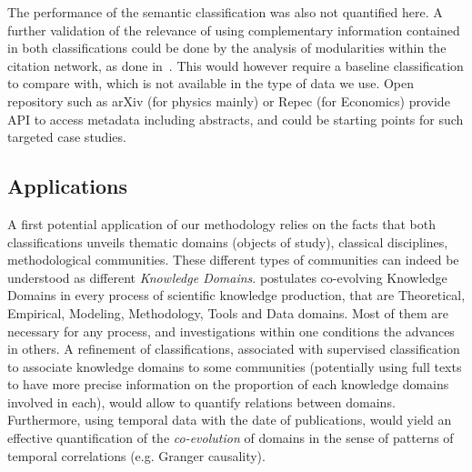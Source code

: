 
The performance of the semantic classification was also not quantified here. A further validation of the relevance of using complementary information contained in both classifications could be done by the analysis of modularities within the citation network, as done in~\cite{bergeaud2017classifying}. This would however require a baseline classification to compare with, which is not available in the type of data we use. Open repository such as arXiv (for physics mainly) or Repec (for Economics) provide API to access metadata including abstracts, and could be starting points for such targeted case studies.




\subsection*{Applications}


A first potential application of our methodology relies on the facts that both classifications unveils thematic domains (objects of study), classical disciplines, methodological communities. These different types of communities can indeed be understood as different \emph{Knowledge Domains}. \cite{raimbault2017applied} postulates co-evolving Knowledge Domains in every process of scientific knowledge production, that are Theoretical, Empirical, Modeling, Methodology, Tools and Data domains. Most of them are necessary for any process, and investigations within one conditions the advances in others. A refinement of classifications, associated with supervised classification to associate knowledge domains to some communities (potentially using full texts to have more precise information on the proportion of each knowledge domains involved in each), would allow to quantify relations between domains. Furthermore, using temporal data with the date of publications, would yield an effective quantification of the \emph{co-evolution} of domains in the sense of patterns of temporal correlations (e.g. Granger causality).


